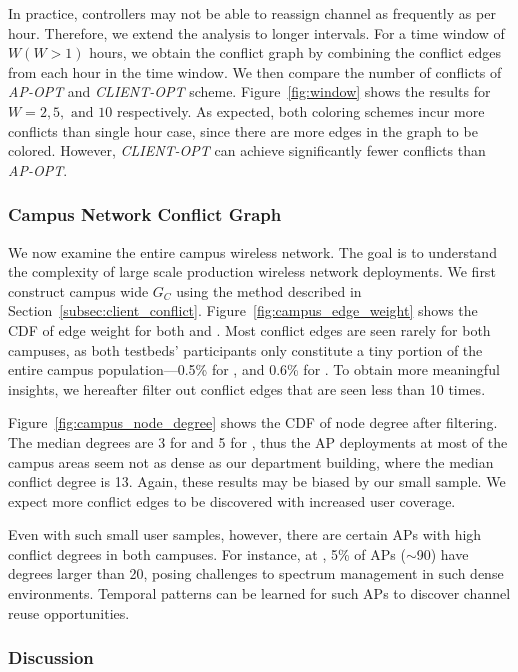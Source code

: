 In practice, controllers may not be able to reassign channel as frequently as
per hour. Therefore, we extend the analysis to longer intervals. For a time
window of $W (W>1)$ hours, we obtain the conflict graph by combining the
conflict edges from each hour in the time window. We then compare the number of
conflicts of \textit{AP-OPT} and \textit{CLIENT-OPT} scheme.
Figure~\ref{fig:window} shows the results for $W=2, 5, \text{ and } 10$
respectively. As expected, both coloring schemes incur more conflicts than
single hour case, since there are more edges in the graph to be colored.
However, \textit{CLIENT-OPT} can achieve significantly fewer conflicts than
\textit{AP-OPT}.

\subsubsection{Campus Network Conflict Graph}

We now examine the entire campus wireless network. The goal is to understand
the complexity of large scale production wireless network deployments. We
first construct campus wide $G_C$ using the method described in
Section~\ref{subsec:client_conflict}. Figure~\ref{fig:campus_edge_weight}
shows the CDF of edge weight for both \ub{} and \nd{}. Most conflict edges are seen
rarely for both campuses, as both testbeds' participants only constitute a
tiny portion of the entire campus population---0.5\% for \nd{}, and 0.6\% for
\ub{}. To obtain more meaningful insights, we hereafter filter out conflict
edges that are seen less than 10 times.

Figure~\ref{fig:campus_node_degree} shows the CDF of node degree after
filtering. The median degrees are 3 for \nd{} and 5 for \ub{}, thus the AP
deployments at most of the campus areas seem not as dense as our department
building, where the median conflict degree is 13. Again, these results may be
biased by our small sample. We expect more conflict edges to be discovered with
increased user coverage.

Even with such small user samples, however, there are certain APs with high
conflict degrees in both campuses. For instance, at \ub{}, 5\% of APs ($\sim$90)
have degrees larger than 20, posing challenges to spectrum management in such
dense environments. Temporal patterns can be learned for such APs to discover
channel reuse opportunities.


\subsubsection{Discussion}


